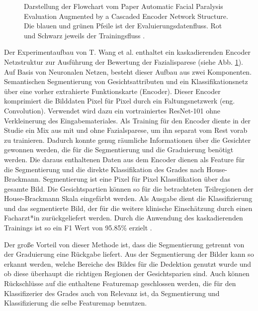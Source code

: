 \begin{figure}[!b]
{
}%
\caption[Darstellung der Flowchart vom Paper Automatic Facial Paralysis Evaluation Augmented by a Cascaded Encoder Network Structure.]{Darstellung der Flowchart vom Paper Automatic Facial Paralysis Evaluation Augmented by a Cascaded Encoder Network Structure. Die blauen und grünen Pfeile ist der Evaluierungsdatenfluss. Rot und Schwarz jeweils der Trainingsfluss \cite{detection_fp2}.}\label{cap:paper_1}
\end{figure}\label{fig:paper_1}

Der Experimentaufbau von T. Wang et al. enthaltet ein kaskadierenden Encoder Netzstruktur zur Ausführung der Bewertung der Fazialisparese (siehe Abb. \ref{cap:paper_1}). Auf Basis von Neuronalen Netzen, besteht dieser Aufbau aus zwei Komponenten. Semantischen Segmentierung von Gesichtsattributen und ein Klassifikationsnetz über eine vorher extrahierte Funktionskarte (Encoder). Dieser Encoder komprimiert die Bilddaten Pixel für Pixel durch ein Faltungsnetzwerk (eng. Convolution). Verwendet wird dazu ein vortrainiertes ResNet-101 ohne Verkleinerung des Eingabemateriales. Als Training für den Encoder diente in der Studie ein Mix aus mit und ohne Fazialsparese, um ihn separat vom Rest vorab zu trainieren. Dadurch konnte genug räumliche Informationen über die Gesichter gewonnen werden, die für die Segmentierung und die Graduierung benötigt werden. Die daraus enthaltenen Daten aus dem Encoder dienen als Feature für die Segmentierung und die direkte Klassifikation des Grades nach House-Brackmann. Segmentierung ist eine Pixel für Pixel Klassifikation über das gesamte Bild. Die Gesichtspartien können so für die betrachteten Teilregionen der House-Brackmann Skala eingefärbt werden. Als Ausgabe dient die Klassifizierung und das segmentierte Bild, der für die weitere klinische Einschätzung durch einen Facharzt*in zurückgeliefert werden. Durch die Anwendung des kaskadierenden Trainings ist so ein F1 Wert von 95.85\% erzielt \cite{detection_fp2}.

Der große Vorteil von dieser Methode ist, dass die Segmentierung getrennt von der Graduierung eine Rückgabe liefert. Aus der Segmentierung der Bilder kann so erkannt werden, welche Bereiche des Bildes für die Dedektion genutzt wurde und ob diese überhaupt die richtigen Regionen der Gesichtsparien sind. Auch können Rückschlüsse auf die enthaltene Featuremap geschlossen werden, die für den Klassifizerier des Grades auch von Relevanz ist, da Segmentierung und Klassifizierung die selbe Featuremap benutzen.



